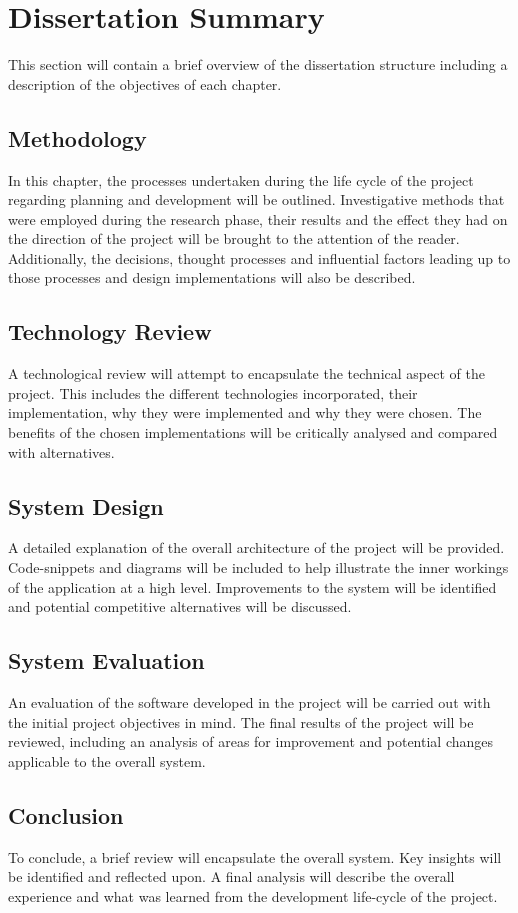 \section{Dissertation Summary}
This section will contain a brief overview of the dissertation structure including a description of the objectives of each chapter.

\subsection{Methodology}
In this chapter, the processes undertaken during the life cycle of the project regarding planning and development will be outlined. Investigative methods that were employed during the research phase, their results and the effect they had on the direction of the project will be brought to the attention of the reader. Additionally, the decisions, thought processes and influential factors leading up to those processes and design implementations will also be described.

\subsection{Technology Review}
A technological review will attempt to encapsulate the technical aspect of the project. This includes the different technologies incorporated, their implementation, why they were implemented and why they were chosen. The benefits of the chosen implementations will be critically analysed and compared with alternatives.
\subsection{System Design}
A detailed explanation of the overall architecture of the project will be provided. Code-snippets and diagrams will be included to help illustrate the inner workings of the application at a high level. Improvements to the system will be identified and potential competitive alternatives will be discussed.
\subsection{System Evaluation}
An evaluation of the software developed in the project will be carried out with the initial project objectives in mind. The final results of the project will be reviewed, including an analysis of areas for improvement and potential changes applicable to the overall system.
\subsection{Conclusion}
To conclude, a brief review will encapsulate the overall system. Key insights will be identified and reflected upon. A final analysis will describe the overall experience and what was learned from the development life-cycle of the project.